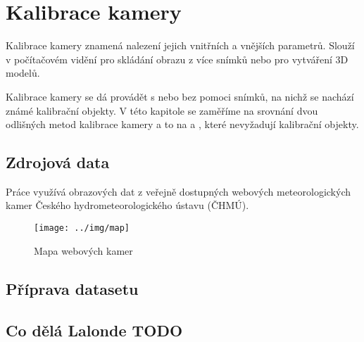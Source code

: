 

\chapter{Kalibrace kamery}
Kalibrace kamery znamená nalezení jejich vnitřních a vnějších parametrů.
Slouží v počítačovém vidění pro skládání obrazu z více snímků nebo pro vytváření 3D modelů.


Kalibrace kamery se dá provádět s nebo bez pomoci snímků, na nichž se nachází známé kalibrační objekty.
V této kapitole se zaměříme na srovnání dvou odlišných metod kalibrace kamery a to na \cite{Lalonde10} a \cite{deepcalib}, které nevyžadují kalibrační objekty.
\section{Zdrojová data}
Práce využívá obrazových dat z veřejně dostupných webových meteorologických kamer Českého hydrometeorologického ústavu (ČHMÚ).


\begin{figure}[h]\centering
    \texttt{[image: ../img/map]}
    \caption{Mapa webových kamer \cite{chmu}}

\end{figure}

\section{Příprava datasetu}


\section{Co dělá Lalonde TODO}
